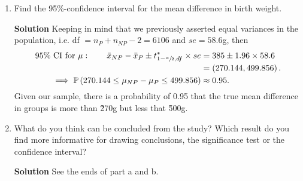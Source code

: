 \begin{enumerate}
\begin{enumerate}
        \item Find the 95\%-confidence interval for the mean difference in birth weight.
        \begin{framed}{\textbf{Solution}}
        Keeping in mind that we previously asserted equal variances in the population, i.e. df $=n_P + n_{NP}-2= 6106$ and $se=58.6$g, then
        \begin{align}
            \text{95\% CI for } \mu : \qquad \bar{x}_{NP} - \bar{x}_P \pm t^*_{1 - \sfrac{\alpha}{2}, df} \times se &= 385 \pm 1.96 \times 58.6 \\
            &= \left( 270.144, 499.856\right). \\
            \implies \operatorname{\mathbb{P}}{\left( 270.144 \leq \mu_{NP} - \mu_P \leq 499.856\right)} &\approx 0.95.
        \end{align}
        Given our sample, there is a probability of 0.95 that the true mean difference in groups is more than \~270g but less that \~500g.
        \end{framed}
        
        \item What do you think can be concluded from the study? Which result do you find more informative for drawing conclusions, the significance test or the confidence interval?
        \begin{framed}{\textbf{Solution}}
        See the ends of part a and b.
        \end{framed}
    \end{enumerate}
    

\end{enumerate}
